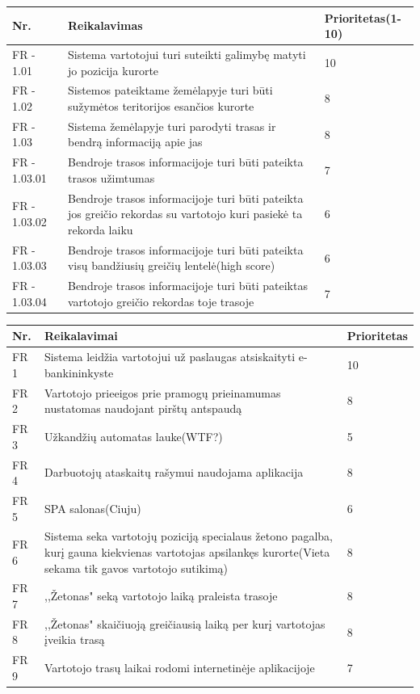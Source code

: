 \documentclass[oneside]{VUMIFPSkursinis}
\begin{document}
\begin{table}[htbp]
	\begin{tabularx}{1\textwidth}{ |P{2.5cm}|X|P{3cm }| }  \hline
		Nr. & Reikalavimas & Prioritetas(1-10) \\ \hline
		FR - 1.01 & Sistema vartotojui turi suteikti galimybę matyti jo pozicija kurorte & 10 \\ \hline
		FR - 1.02 & Sistemos pateiktame žemėlapyje turi būti sužymėtos teritorijos esančios kurorte & 8 \\ \hline
		FR - 1.03 & Sistema žemėlapyje turi parodyti trasas ir bendrą informaciją apie jas & 8 \\ \hline
		FR - 1.03.01 & Bendroje trasos informacijoje turi būti pateikta trasos užimtumas & 7 \\ \hline
		FR - 1.03.02 & Bendroje trasos informacijoje turi būti pateikta jos greičio rekordas su vartotojo kuri pasiekė ta rekorda laiku & 6 \\ \hline
		FR - 1.03.03 & Bendroje trasos informacijoje turi būti pateikta visų bandžiusių greičių lentelė(high score) & 6 \\ \hline
		FR - 1.03.04 & Bendroje trasos informacijoje turi būti pateiktas vartotojo greičio rekordas toje trasoje & 7 \\ \hline
		
	\end{tabularx}

\end{table}
\begin{table}[htbp]

\begin{tabularx}{1\textwidth}{ |P{2.5cm}|X|P{3cm }| }  \hline
	Nr. & Reikalavimai & Prioritetas \\ \hline
	FR 1 & Sistema leidžia vartotojui už paslaugas atsiskaityti e-bankininkyste & 10 \\ \hline
	FR 2 & Vartotojo prieeigos prie pramogų prieinamumas nustatomas naudojant pirštų antspaudą & 8 \\ \hline
	FR 3 & Užkandžių automatas lauke(WTF?) & 5 \\ \hline
	FR 4 & Darbuotojų ataskaitų rašymui naudojama aplikacija & 8 \\ \hline
	FR 5 & SPA salonas(Ciuju) & 6 \\ \hline
	FR 6 & Sistema seka vartotojų poziciją specialaus žetono pagalba, kurį gauna kiekvienas vartotojas apsilankęs kurorte(Vieta sekama tik gavos vartotojo sutikimą) & 8  \\ \hline
	FR 7 & ,,Žetonas" seką vartotojo laiką praleista trasoje & 8 \\ \hline
	FR 8 & ,,Žetonas" skaičiuoją greičiausią laiką per kurį vartotojas įveikia trasą &  8 \\ \hline
	FR 9 & Vartotojo trasų laikai rodomi internetinėje aplikacijoje & 7 \\ \hline 
	

\end{tabularx}

	
\end{table}
\end{document}
